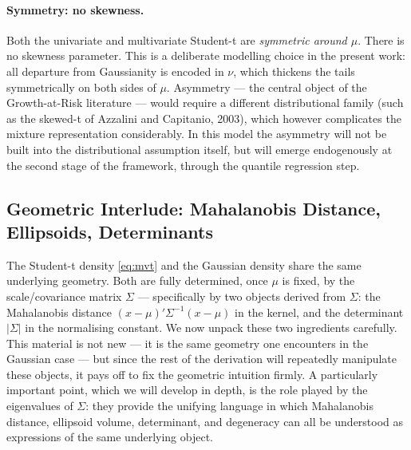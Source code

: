 \documentclass[11pt, a4paper, oneside]{article}
\begin{document}
\paragraph{Symmetry: no skewness.}
Both the univariate and multivariate Student-t are \emph{symmetric
around $\mu$}. There is no skewness parameter. This is a deliberate
modelling choice in the present work: all departure from Gaussianity is
encoded in $\nu$, which thickens the tails symmetrically on both sides
of $\mu$. Asymmetry — the central object of the Growth-at-Risk
literature — would require a different distributional family (such as
the skewed-t of Azzalini and Capitanio, 2003), which however complicates
the mixture representation considerably. In this model the asymmetry
will not be built into the distributional assumption itself, but will
emerge endogenously at the second stage of the framework, through the
quantile regression step.

\newpage
\subsection{Geometric Interlude: Mahalanobis Distance, Ellipsoids, Determinants}
\label{sec:geometric-interlude}

The Student-t density \eqref{eq:mvt} and the Gaussian density share the
same underlying geometry. Both are fully determined, once $\mu$ is fixed,
by the scale/covariance matrix $\Sigma$ — specifically by two objects
derived from $\Sigma$: the Mahalanobis distance
$(x-\mu)'\Sigma^{-1}(x-\mu)$ in the kernel, and the determinant $|\Sigma|$
in the normalising constant. We now unpack these two ingredients
carefully. This material is not new — it is the same geometry one
encounters in the Gaussian case — but since the rest of the derivation
will repeatedly manipulate these objects, it pays off to fix the
geometric intuition firmly. A particularly important point, which we will
develop in depth, is the role played by the eigenvalues of $\Sigma$:
they provide the unifying language in which Mahalanobis distance,
ellipsoid volume, determinant, and degeneracy can all be understood as
expressions of the same underlying object.
\end{document}
